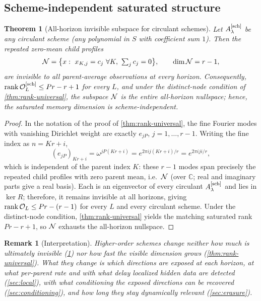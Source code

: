 \documentclass[pdflatex,sn-mathphys-num]{sn-jnl}%
\theoremstyle{thmstyleone}%
\newtheorem{theorem}{Theorem}%
\theoremstyle{thmstyletwo}%
\newtheorem{remark}{Remark}%
\theoremstyle{thmstylethree}%
\DeclareMathOperator{\rank}{rank}
\newcommand{\OL}{{\cal O}_L}
\newcommand{\Asch}{A^{[\rm sch]}_\lambda}
\begin{document}
\subsection{Scheme-independent saturated structure}\label{sec:invisible}

\begin{theorem}[All-horizon invisible subspace for circulant schemes]\label{thm:invisible-general}
Let $\Asch$ be any circulant scheme (any polynomial in $S$ with coefficient sum $1$).
Then the repeated zero-mean child profiles \[ {\cal N} = \bigl\{ x:\ x_{K,j}=c_j\ \forall K,\ \textstyle\sum_j c_j=0 \bigr\}, \qquad \dim{\cal N}=r-1, \] are invisible to all parent-average observations at every horizon.
Consequently, $\rank\OL^{[\rm sch]}\le Pr-r+1$ for every $L$, and under the distinct-node condition of \cref{thm:rank-universal}, the subspace ${\cal N}$ is the entire all-horizon nullspace; hence, the saturated memory dimension is scheme-independent.
\end{theorem}

\begin{proof}
In the notation of the proof of \cref{thm:rank-universal}, the fine Fourier modes with vanishing Dirichlet weight are exactly $e_{jP}$, $j=1,\ldots,r-1$.
Writing the fine index as $n=Kr+i$, \[ (e_{jP})_{Kr+i} = \omega^{jP(Kr+i)} = e^{2\pi ij(Kr+i)/r} = e^{2\pi iji/r}, \] which is independent of the parent index $K$: these $r-1$ modes span precisely the repeated child profiles with zero parent mean, i.e.\ ${\cal N}$ (over $\mathbb C$; real and imaginary parts give a real basis).
Each is an eigenvector of every circulant $\Asch$ and lies in $\ker R$; therefore, it remains invisible at all horizons, giving $\rank\OL\le Pr-(r-1)$ for every $L$ and every circulant scheme.
Under the distinct-node condition, \cref{thm:rank-universal} yields the matching saturated rank $Pr-r+1$, so ${\cal N}$ exhausts the all-horizon nullspace.
\end{proof}

\begin{remark}[Interpretation]
Higher-order schemes change neither how much is ultimately invisible (\cref{thm:invisible-general}) nor how fast the visible dimension grows (\cref{thm:rank-universal}).
What they change is \emph{which} directions are exposed at each horizon, at what per-parent rate and with what delay localized hidden data are detected (\cref{sec:local}), with what conditioning the exposed directions can be recovered (\cref{sec:conditioning}), and how long they stay dynamically relevant (\cref{sec:erasure}).
\end{remark}
\end{document}

